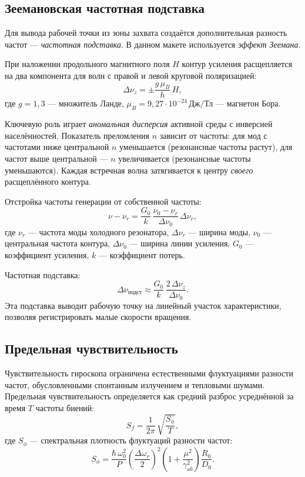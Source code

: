 \documentclass[12pt, a4paper]{article}
\newcommand{\unit}[1]{\text{#1}}
\begin{document}
\subsection*{Зеемановская частотная подставка}
Для вывода рабочей точки из зоны захвата создаётся дополнительная разность частот --- \textit{частотная подставка}. В данном макете используется \textit{эффект Зеемана}.

При наложении продольного магнитного поля $H$ контур усиления расщепляется на два компонента для волн с правой и левой круговой поляризацией:
\begin{equation}
    \Delta \nu_z = \pm \frac{g\,\mu_B}{h}\,H,
\end{equation}
где $g = 1{,}3$ --- множитель Ланде, $\mu_B = 9{,}27 \cdot 10^{-24}\,\unit{Дж/Тл}$ --- магнетон Бора.

Ключевую роль играет \textit{аномальная дисперсия} активной среды с инверсией населённостей. Показатель преломления $n$ зависит от частоты: для мод с частотами ниже центральной $n$ уменьшается (резонансные частоты растут), для частот выше центральной --- $n$ увеличивается (резонансные частоты уменьшаются). Каждая встречная волна затягивается к центру \textit{своего} расщеплённого контура.

Отстройка частоты генерации от собственной частоты:
\begin{equation}
    \nu - \nu_r = \frac{G_0}{k}\,\frac{\nu_0 - \nu_r}{\Delta \nu_0}\,\Delta \nu_r,
\end{equation}
где $\nu_r$ --- частота моды холодного резонатора, $\Delta \nu_r$ --- ширина моды, $\nu_0$ --- центральная частота контура, $\Delta \nu_0$ --- ширина линии усиления, $G_0$ --- коэффициент усиления, $k$ --- коэффициент потерь.

Частотная подставка:
\begin{equation}
    \Delta \nu_{\text{подст}} \approx \frac{G_0}{k}\,\frac{2\,\Delta \nu_z}{\Delta \nu_0}.
\end{equation}
Эта подставка выводит рабочую точку на линейный участок характеристики, позволяя регистрировать малые скорости вращения.

\subsection*{Предельная чувствительность}
Чувствительность гироскопа ограничена естественными флуктуациями разности частот, обусловленными спонтанным излучением и тепловыми шумами. Предельная чувствительность определяется как средний разброс усреднённой за время $T$ частоты биений:
\begin{equation}
    S_f = \frac{1}{2\pi}\,\sqrt{\frac{S_\phi}{T}},
\end{equation}
где $S_\phi$ --- спектральная плотность флуктуаций разности частот:
\begin{equation}
    S_\phi = \frac{\hbar\,\omega_0^2}{P}\left(\frac{\Delta \omega_r}{2}\right)^2\left(1 + \frac{\mu^2}{\gamma_{ab}^2}\right)\frac{R_0}{D_0}.
\end{equation}
\end{document}
